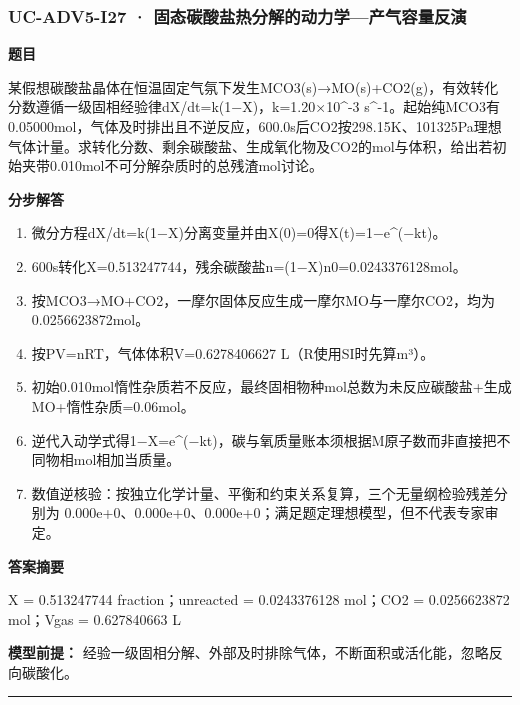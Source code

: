 \documentclass[UTF8,11pt,a4paper]{ctexart}
\begin{document}
\subsubsection*{UC-ADV5-I27 · 固态碳酸盐热分解的动力学—产气容量反演}
\noindent\textbf{题目}\par
某假想碳酸盐晶体在恒温固定气氛下发生MCO3(s)→MO(s)+CO2(g)，有效转化分数遵循一级固相经验律dX/dt=k(1−X)，k=1.20×10\textasciicircum{}-3 s\textasciicircum{}-1。起始纯MCO3有0.05000mol，气体及时排出且不逆反应，600.0s后CO2按298.15K、101325Pa理想气体计量。求转化分数、剩余碳酸盐、生成氧化物及CO2的mol与体积，给出若初始夹带0.010mol不可分解杂质时的总残渣mol讨论。\par
\medskip\noindent\textbf{分步解答}
\begin{enumerate}
\item 微分方程dX/dt=k(1−X)分离变量并由X(0)=0得X(t)=1−e\textasciicircum{}(−kt)。
\item 600s转化X=0.513247744，残余碳酸盐n=(1−X)n0=0.0243376128mol。
\item 按MCO3→MO+CO2，一摩尔固体反应生成一摩尔MO与一摩尔CO2，均为0.0256623872mol。
\item 按PV=nRT，气体体积V=0.6278406627 L（R使用SI时先算m³）。
\item 初始0.010mol惰性杂质若不反应，最终固相物种mol总数为未反应碳酸盐+生成MO+惰性杂质=0.06mol。
\item 逆代入动学式得1−X=e\textasciicircum{}(−kt)，碳与氧质量账本须根据M原子数而非直接把不同物相mol相加当质量。
\item 数值逆核验：按独立化学计量、平衡和约束关系复算，三个无量纲检验残差分别为 0.000e+0、0.000e+0、0.000e+0；满足题定理想模型，但不代表专家审定。
\end{enumerate}
\noindent\textbf{答案摘要}\par
X = 0.513247744 fraction；unreacted = 0.0243376128 mol；CO2 = 0.0256623872 mol；Vgas = 0.627840663 L\par
\noindent\textbf{模型前提：}
经验一级固相分解、外部及时排除气体，不断面积或活化能，忽略反向碳酸化。\par
\medskip\hrule\medskip
{}
\end{document}

